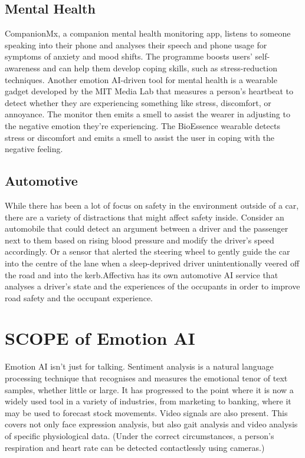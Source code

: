 \documentclass[12pt]{article}
\begin{document}
\subsection{Mental Health}
CompanionMx, a companion mental health monitoring app, listens to someone speaking into their phone and analyses their speech and phone usage for symptoms of anxiety and mood shifts. The programme boosts users' self-awareness and can help them develop coping skills, such as stress-reduction techniques. Another emotion AI-driven tool for mental health is a wearable gadget developed by the MIT Media Lab that measures a person’s heartbeat to detect whether they are experiencing something like stress, discomfort, or annoyance. The monitor then emits a smell to assist the wearer in adjusting to the negative emotion they're experiencing. The BioEssence wearable detects stress or discomfort and emits a smell to assist the user in coping with the negative feeling.
\subsection{Automotive}
While there has been a lot of focus on safety in the environment outside of a car, there are a variety of distractions that might affect safety inside. Consider an automobile that could detect an argument between a driver and the passenger next to them based on rising blood pressure and modify the driver's speed accordingly. Or a sensor that alerted the steering wheel to gently guide the car into the centre of the lane when a sleep-deprived driver unintentionally veered off the road and into the kerb.Affectiva has its own automotive AI service that analyses a driver's state and the experiences of the occupants in order to improve road safety and the occupant experience.
\section{SCOPE of Emotion AI}
Emotion AI isn't just for talking. Sentiment analysis is a natural language processing technique that recognises and measures the emotional tenor of text samples, whether little or large. It has progressed to the point where it is now a widely used tool in a variety of industries, from marketing to banking, where it may be used to forecast stock movements. Video signals are also present. This covers not only face expression analysis, but also gait analysis and video analysis of specific physiological data. (Under the correct circumstances, a person's respiration and heart rate can be detected contactlessly using cameras.)
\end{document}
